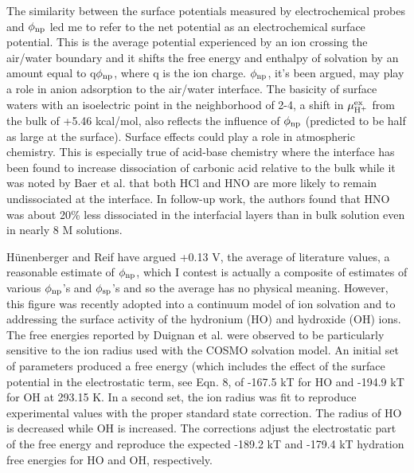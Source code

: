\begin{intro}
   The similarity between the surface potentials measured by electrochemical probes and $\phi_{\mathrm{np}}$ led me to refer to the net potential as an electrochemical 
   surface potential. This is the average potential experienced by an ion crossing the air/water boundary and it shifts the free energy and enthalpy of solvation by 
   an amount equal to q$\phi_{\mathrm{np}}$, where q is the ion charge. $\phi_{\mathrm{np}}$, it's been argued\cite{ayse2012}, may play a role in anion adsorption to the air/water
   interface\cite{jungwirth2002airwat,jungwirth2006airwat}. The basicity of surface waters with an isoelectric point in the neighborhood of 
   2-4\cite{buch2007surfacid,mishra2012surfacid,beattie2014surfacid}, a shift in $\mu^{\mathrm{ex}}_{\mathrm{H^{\mathrm{+}}}}$ from the bulk of +5.46 kcal/mol, also reflects the influence
   of $\phi_{\mathrm{np}}$ (predicted to be half as large at the surface)\cite{ayse2012,duignan2015hydronium}. Surface effects could play a role in atmospheric 
   chemistry\cite{buch2007surfacid}. This is especially true of acid-base chemistry where the interface has been found to increase dissociation of carbonic acid
   relative to the bulk\cite{galib2014oceanacid,galib2014hbondingcarbonic} while it was noted by Baer et al. that both HCl and HNO are more likely to remain
   undissociated at the interface\cite{baer2014investigation}. In follow-up work, the authors found that HNO was about 20\% less dissociated in the interfacial 
   layers than in bulk solution even in nearly 8 M solutions\cite{lewis2011does}.

   H\"{u}nenberger and Reif\cite{hunenberger2011sp} have argued +0.13 V, the average of literature values, a reasonable estimate of $\phi_{\mathrm{np}}$, which
   I contest is actually a composite of estimates of various $\phi_{\mathrm{np}}$'s and $\phi_{\mathrm{sp}}$'s and so the average has no physical meaning. However, this figure was
   recently adopted into a continuum model of ion solvation\cite{duignan2014ion} and to addressing the surface activity of the hydronium (HO\sur{+}) and hydroxide (OH\sur{-}) 
   ions\cite{duignan2015hydronium}. The free energies reported by Duignan et al.\cite{duignan2015hydronium} were observed to be particularly sensitive to the ion radius 
   used with the COSMO solvation model. An initial set of parameters produced a free energy (which includes the effect of the surface potential in the electrostatic term, 
   see Eqn. 8, of -167.5 kT for HO\sur{+} and -194.9 kT for OH\sur{-} at 293.15 K. In a second set, the ion radius was fit to reproduce
   experimental values with the proper standard state correction\cite{camaioni2005stdstcorr}. The radius of HO\sur{+} is decreased while OH\sur{-} is increased.
   The corrections adjust the electrostatic part of the free energy and reproduce the expected -189.2 kT and -179.4 kT hydration free energies for HO\sur{+} 
   and OH\sur{-}, respectively\cite{camaioni2005stdstcorr}. 


\end{intro}

